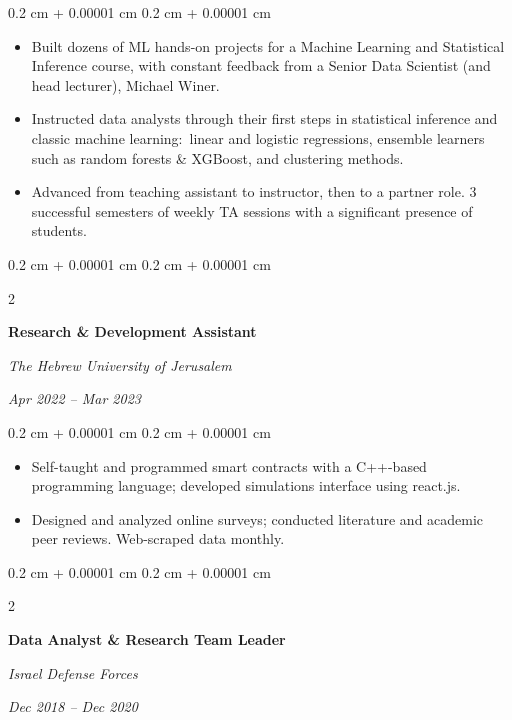 \documentclass[10pt, letterpaper]{article}
\newenvironment{highlights}{
    \begin{itemize}[
        topsep=0.10 cm,
        parsep=0.10 cm,
        partopsep=0pt,
        itemsep=0pt,
        leftmargin=0.4 cm + 10pt
    ]
}{
    \end{itemize}
} %
\newenvironment{onecolentry}{
    \begin{adjustwidth}{
        0.2 cm + 0.00001 cm
    }{
        0.2 cm + 0.00001 cm
    }
}{
    \end{adjustwidth}
} %
\newenvironment{twocolentry}[2][]{
    \onecolentry
    \def\secondColumn{#2}
    \setcolumnwidth{\fill, 4.5 cm}
    \begin{paracol}{2}
}{
    \switchcolumn \raggedleft \secondColumn
    \end{paracol}
    \endonecolentry
} %
\begin{document}
        \vspace{0.10 cm}
        \begin{onecolentry}
            \begin{highlights}
                \item Built dozens of ML hands-on projects for a Machine Learning and Statistical Inference course, with constant feedback from a Senior Data Scientist (and head lecturer), Michael Winer.
                \item Instructed data analysts through their first steps in statistical inference and classic machine learning$:$ linear and logistic regressions, ensemble learners such as random forests \& XGBoost, and clustering methods.
                \item Advanced from teaching assistant to instructor, then to a partner role. 3 successful semesters of weekly TA sessions with a significant presence of students.
            \end{highlights}
        \end{onecolentry}


        \vspace{0.2 cm}

        \begin{twocolentry}{
            
            
        \textit{Apr 2022 – Mar 2023}}
            \textbf{Research \& Development Assistant}
            
            \textit{The Hebrew University of Jerusalem}
        \end{twocolentry}

        \vspace{0.10 cm}
        \begin{onecolentry}
            \begin{highlights}
                \item Self-taught and programmed smart contracts with a C++-based programming language; developed simulations interface using react.js.
                \item Designed and analyzed online surveys; conducted literature and academic peer reviews. Web-scraped data monthly.
            \end{highlights}
        \end{onecolentry}


        \vspace{0.2 cm}

        \begin{twocolentry}{
            
            
        \textit{Dec 2018 – Dec 2020}}
            \textbf{Data Analyst \& Research Team Leader}
            
            \textit{Israel Defense Forces}
        \end{twocolentry}
\end{document}
